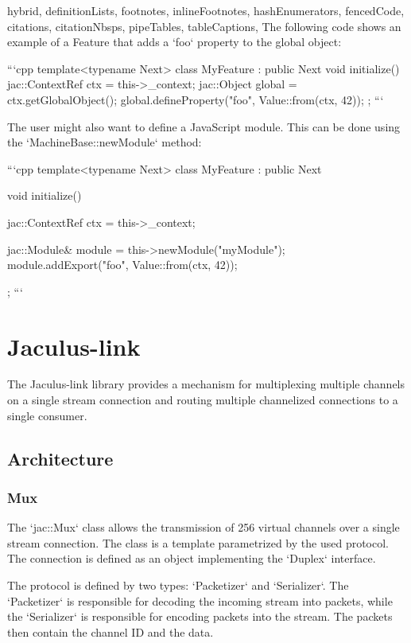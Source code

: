 \documentclass[
  digital,
  oneside,
  nosansbold,
  nocolorbold,
  lof,
  lot
]{fithesis4}
\begin{document}
\begin{markdown*}{%
  hybrid,
  definitionLists,
  footnotes,
  inlineFootnotes,
  hashEnumerators,
  fencedCode,
  citations,
  citationNbsps,
  pipeTables,
  tableCaptions,
}
The following code shows an example of a Feature that adds a `foo` property to the global object:

```cpp
template<typename Next>
class MyFeature : public Next {
    void initialize() {
        jac::ContextRef ctx = this->_context;
        jac::Object global = ctx.getGlobalObject();
        global.defineProperty("foo", Value::from(ctx, 42));
    }
};
```

The user might also want to define a JavaScript module. This can be done using the `MachineBase::newModule` method:

```cpp
template<typename Next>
class MyFeature : public Next {
    void initialize() {
        jac::ContextRef ctx = this->_context;

        jac::Module& module = this->newModule("myModule");
        module.addExport("foo", Value::from(ctx, 42));
    }
};
```


\chapter{Jaculus-link}

The Jaculus-link library provides a mechanism for multiplexing multiple channels on a single stream connection and routing multiple channelized connections to a single consumer.



\section{Architecture}

\subsection{Mux}

The `jac::Mux` class allows the transmission of 256 virtual channels over a single stream connection. The class is a template parametrized by the used protocol. The connection is defined as an object implementing the `Duplex` interface.

The protocol is defined by two types: `Packetizer` and `Serializer`. The `Packetizer` is responsible for decoding the incoming stream into packets, while the `Serializer` is responsible for encoding packets into the stream. The packets then contain the channel ID and the data.


\end{markdown*}
\end{document}

